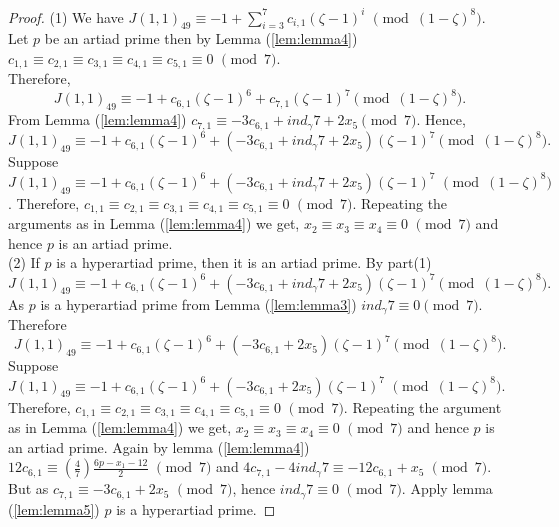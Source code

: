 \documentclass[a4paper,12pt]{article}
\def\vpmod{\!\!\!\pmod}
\begin{document}
\begin{proof}
(1) We have $J(1,1)_{49}\equiv -1 + \displaystyle{\sum_{i=3}^{7}c_{i,1}(\zeta -1)^i}\,\, \vpmod{(1-\zeta)^{8}}$.\\
 Let $p$ be an artiad prime then by Lemma (\ref{lem:lemma4}) $c_{1,1}\equiv c_{2,1}\equiv c_{3,1}\equiv c_{4,1}\equiv c_{5,1}\equiv 0\,\,\vpmod 7$.\\
 Therefore, \begin{equation*}\label{eq:20}
 J(1,1)_{49}\equiv -1 +c_{6,1}(\zeta -1)^6+c_{7,1}(\zeta -1)^7 \vpmod{(1-\zeta)^{8}}.
             \end{equation*}
From Lemma (\ref{lem:lemma4}) $c_{7,1}\equiv-3c_{6,1}+ind_{\gamma}7+2x_{5}\vpmod 7.$
Hence, 
 $$J(1,1)_{49}\equiv -1 +c_{6,1}(\zeta -1)^6+(-3c_{6,1}+ind_{\gamma}7+2x_{5})(\zeta -1)^7 \vpmod{(1-\zeta)^{8}}.$$
\noindent Suppose $J(1,1)_{49}\equiv -1 +c_{6,1}(\zeta -1)^6+(-3c_{6,1}+ind_{\gamma}7+2x_{5})(\zeta -1)^7\,\, \vpmod{(1-\zeta)^{8}}$.
 Therefore, $c_{1,1}\equiv c_{2,1}\equiv c_{3,1} \equiv c_{4,1}\equiv c_{5,1}\equiv 0\,\,\vpmod 7$. Repeating the arguments as in Lemma (\ref{lem:lemma4})
 we get, $x_{2}\equiv x_{3}\equiv x_{4}\equiv 0\,\,\vpmod 7$ and hence $p$ is an artiad prime.\\
(2) If $p$ is a hyperartiad prime, then it is an artiad prime. By part(1) $$J(1,1)_{49}\equiv -1 +c_{6,1}(\zeta -1)^6+(-3c_{6,1}+ind_{\gamma}7+2x_{5})(\zeta -1)^7 \vpmod{(1-\zeta)^{8}}.$$
As $p$ is a hyperartiad prime from Lemma (\ref{lem:lemma3}) $ind_{\gamma}7\equiv 0\vpmod7$. Therefore
\begin{equation*}\label{eq29}
J(1,1)_{49}\equiv -1 +c_{6,1}(\zeta -1)^6+(-3c_{6,1}+2x_{5})(\zeta -1)^7 \vpmod{(1-\zeta)^{8}}.
\end{equation*}
\noindent Suppose $J(1,1)_{49}\equiv -1 +c_{6,1}(\zeta -1)^6+(-3c_{6,1}+2x_{5})(\zeta -1)^7\,\, \vpmod{(1-\zeta)^{8}}$. 
Therefore, $c_{1,1}\equiv c_{2,1}\equiv c_{3,1} \equiv c_{4,1}\equiv c_{5,1}\equiv 0\,\,\vpmod 7$. Repeating the argument as in Lemma (\ref{lem:lemma4}) we get, $x_{2}\equiv x_{3}\equiv x_{4}\equiv 0\,\,\vpmod 7$ and hence $p$ is an artiad prime.
Again by lemma (\ref{lem:lemma4}) $12c_{6,1}\equiv (\frac{4}{7})\frac{6p-x_{1}-12}{2}\,\,\vpmod7$ and $4c_{7,1}-4ind_{\gamma}7\equiv-12c_{6,1}+x_{5}\,\,\vpmod7$.
But as $c_{7,1}\equiv-3c_{6,1}+2x_{5}\,\,\vpmod 7$, hence $ind_{\gamma}7\equiv 0\,\,\vpmod7$. Apply lemma (\ref{lem:lemma5}) $p$ is a hyperartiad prime.
 \end{proof}
\end{document}
